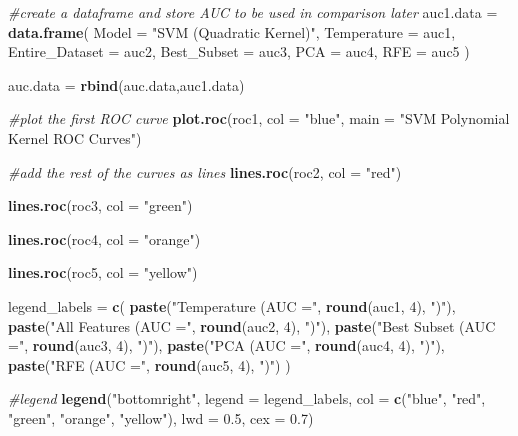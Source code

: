 \documentclass[
]{article}
\newenvironment{Shaded}{\begin{snugshade}}{\end{snugshade}}
\newcommand{\AttributeTok}[1]{\textcolor[rgb]{0.13,0.29,0.53}{#1}}
\newcommand{\CommentTok}[1]{\textcolor[rgb]{0.56,0.35,0.01}{\textit{#1}}}
\newcommand{\DecValTok}[1]{\textcolor[rgb]{0.00,0.00,0.81}{#1}}
\newcommand{\FloatTok}[1]{\textcolor[rgb]{0.00,0.00,0.81}{#1}}
\newcommand{\FunctionTok}[1]{\textcolor[rgb]{0.13,0.29,0.53}{\textbf{#1}}}
\newcommand{\NormalTok}[1]{#1}
\newcommand{\OtherTok}[1]{\textcolor[rgb]{0.56,0.35,0.01}{#1}}
\newcommand{\StringTok}[1]{\textcolor[rgb]{0.31,0.60,0.02}{#1}}
\begin{document}
\begin{Shaded}
\begin{Highlighting}[]
\CommentTok{\#create a dataframe and store AUC to be used in comparison later}
\NormalTok{auc1.data }\OtherTok{=} \FunctionTok{data.frame}\NormalTok{(}
  \AttributeTok{Model =} \StringTok{"SVM (Quadratic Kernel)"}\NormalTok{,}
  \AttributeTok{Temperature =}\NormalTok{ auc1,}
  \AttributeTok{Entire\_Dataset =}\NormalTok{ auc2,}
  \AttributeTok{Best\_Subset =}\NormalTok{ auc3,}
  \AttributeTok{PCA =}\NormalTok{ auc4,}
  \AttributeTok{RFE =}\NormalTok{ auc5}
\NormalTok{)}

\NormalTok{auc.data }\OtherTok{=} \FunctionTok{rbind}\NormalTok{(auc.data,auc1.data)}

\CommentTok{\#plot the first ROC curve}
\FunctionTok{plot.roc}\NormalTok{(roc1, }\AttributeTok{col =} \StringTok{"blue"}\NormalTok{, }\AttributeTok{main =} \StringTok{"SVM Polynomial Kernel ROC Curves"}\NormalTok{)}

\CommentTok{\#add the rest of the curves as lines}
\FunctionTok{lines.roc}\NormalTok{(roc2, }\AttributeTok{col =} \StringTok{"red"}\NormalTok{)}

\FunctionTok{lines.roc}\NormalTok{(roc3, }\AttributeTok{col =} \StringTok{"green"}\NormalTok{)}

\FunctionTok{lines.roc}\NormalTok{(roc4, }\AttributeTok{col =} \StringTok{"orange"}\NormalTok{)}

\FunctionTok{lines.roc}\NormalTok{(roc5, }\AttributeTok{col =} \StringTok{"yellow"}\NormalTok{)}

\NormalTok{legend\_labels }\OtherTok{=} \FunctionTok{c}\NormalTok{(}
  \FunctionTok{paste}\NormalTok{(}\StringTok{"Temperature (AUC ="}\NormalTok{, }\FunctionTok{round}\NormalTok{(auc1, }\DecValTok{4}\NormalTok{), }\StringTok{")"}\NormalTok{),}
  \FunctionTok{paste}\NormalTok{(}\StringTok{"All Features (AUC ="}\NormalTok{, }\FunctionTok{round}\NormalTok{(auc2, }\DecValTok{4}\NormalTok{), }\StringTok{")"}\NormalTok{),}
  \FunctionTok{paste}\NormalTok{(}\StringTok{"Best Subset (AUC ="}\NormalTok{, }\FunctionTok{round}\NormalTok{(auc3, }\DecValTok{4}\NormalTok{), }\StringTok{")"}\NormalTok{),}
  \FunctionTok{paste}\NormalTok{(}\StringTok{"PCA (AUC ="}\NormalTok{, }\FunctionTok{round}\NormalTok{(auc4, }\DecValTok{4}\NormalTok{), }\StringTok{")"}\NormalTok{),}
  \FunctionTok{paste}\NormalTok{(}\StringTok{"RFE (AUC ="}\NormalTok{, }\FunctionTok{round}\NormalTok{(auc5, }\DecValTok{4}\NormalTok{), }\StringTok{")"}\NormalTok{)}
\NormalTok{)}

\CommentTok{\#legend}
\FunctionTok{legend}\NormalTok{(}\StringTok{"bottomright"}\NormalTok{, }\AttributeTok{legend =}\NormalTok{ legend\_labels, }\AttributeTok{col =} \FunctionTok{c}\NormalTok{(}\StringTok{"blue"}\NormalTok{, }\StringTok{"red"}\NormalTok{, }\StringTok{"green"}\NormalTok{, }\StringTok{"orange"}\NormalTok{, }\StringTok{"yellow"}\NormalTok{), }\AttributeTok{lwd =} \FloatTok{0.5}\NormalTok{, }\AttributeTok{cex =} \FloatTok{0.7}\NormalTok{)}
\end{Highlighting}
\end{Shaded}
\end{document}
